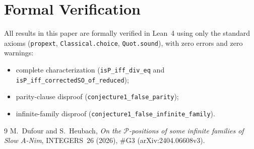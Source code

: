 \documentclass[11pt]{article}
\begin{document}
\section{Formal Verification}

All results in this paper are formally verified in Lean~4 using only the
standard axioms (\texttt{propext}, \texttt{Classical.choice},
\texttt{Quot.sound}), with zero errors and zero warnings:
\begin{itemize}
\item complete characterization (\texttt{isP\_iff\_div\_eq} and
\texttt{isP\_iff\_correctedSO\_of\_reduced});
\item parity-clause disproof (\texttt{conjecture1\_false\_parity});
\item infinite-family disproof (\texttt{conjecture1\_false\_infinite\_family}).
\end{itemize}

\begin{thebibliography}{9}
M.~Dufour and S.~Heubach,
\emph{On the $\mathcal{P}$-positions of some infinite families of Slow $A$-Nim},
INTEGERS~26 (2026), \#G3 (arXiv:2404.06608v3).
\end{thebibliography}
\end{document}
